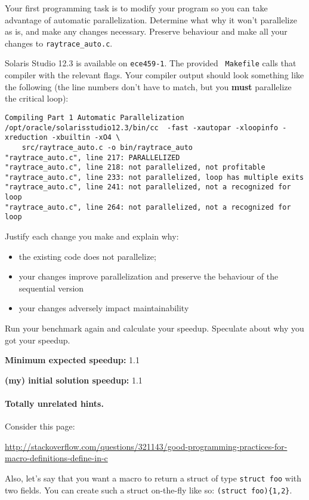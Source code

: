 \documentclass[letterpaper,10pt]{article}
\begin{document}
Your first programming task is to modify your program so you can take
advantage of automatic parallelization. Determine what why it won't
parallelize as is, and make any changes necessary. Preserve behaviour
and make all your changes to {\tt raytrace\_auto.c}.

Solaris Studio 12.3 is available on {\tt ece459-1}. The provided {\tt
  Makefile} calls that compiler with the relevant flags. Your compiler
output should look something like the following (the line numbers
don't have to match, but you {\bf must} parallelize the critical loop):

\newpage
\begin{lstlisting}
Compiling Part 1 Automatic Parallelization
/opt/oracle/solarisstudio12.3/bin/cc  -fast -xautopar -xloopinfo -xreduction -xbuiltin -xO4 \
    src/raytrace_auto.c -o bin/raytrace_auto
"raytrace_auto.c", line 217: PARALLELIZED
"raytrace_auto.c", line 218: not parallelized, not profitable
"raytrace_auto.c", line 233: not parallelized, loop has multiple exits
"raytrace_auto.c", line 241: not parallelized, not a recognized for loop
"raytrace_auto.c", line 264: not parallelized, not a recognized for loop
\end{lstlisting}

Justify each change you make and explain why:
\begin{itemize}
\item the existing code does not parallelize;
\item your changes improve parallelization and preserve the behaviour of the sequential version
\item your changes adversely impact maintainability
\end{itemize}

Run your benchmark again and calculate your speedup. Speculate about why you got your speedup.

\squishlist
  \item {\bf Minimum expected speedup:} 1.1
  \item {\bf (my) initial solution speedup:} 1.1
\squishend

\paragraph{Totally unrelated hints.} Consider this page:
\begin{center}
  \scriptsize \url{http://stackoverflow.com/questions/321143/good-programming-practices-for-macro-definitions-define-in-c}
\end{center}
Also, let's say that you want a macro to return a struct of type {\tt struct foo} with
two fields. You can create such a struct on-the-fly like so: \verb!(struct foo){1,2}!.
\end{document}
